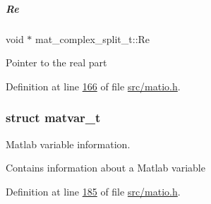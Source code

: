 \mbox{\label{group___m_a_t_a484a93607508adac2bce53a0252e0325}} 
\subparagraph{\texorpdfstring{Re}{Re}}
{\footnotesize\ttfamily void $\ast$ mat\+\_\+complex\+\_\+split\+\_\+t\+::\+Re}

Pointer to the real part 

Definition at line \hyperlink{src_2matio_8h_source_l00166}{166} of file \hyperlink{src_2matio_8h_source}{src/matio.\+h}.

\label{structmatvar__t}
\subsubsection{struct matvar\+\_\+t}
Matlab variable information. 

Contains information about a Matlab variable 

Definition at line \hyperlink{src_2matio_8h_source_l00185}{185} of file \hyperlink{src_2matio_8h_source}{src/matio.\+h}.

